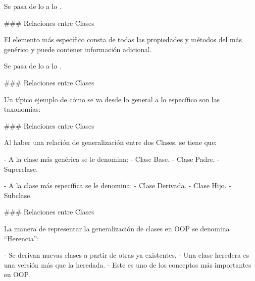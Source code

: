 \vspace{-1em}
\begin{center}\hspace{60mm}\begin{customRoundedBox}{}
\centering Se pasa de lo  a lo .
\end{customRoundedBox}\end{center}

### Relaciones entre Clases


\newline

El elemento más específico consta de todas las propiedades y métodos del más
genérico y puede contener información adicional.

\vspace{-1em}
\begin{center}\hspace{60mm}\begin{customRoundedBox}{}
\centering Se pasa de lo  a lo .
\end{customRoundedBox}\end{center}


### Relaciones entre Clases


Un típico ejemplo de cómo se va desde lo general a lo específico son las taxonomías:\newline

\taxonomyOrg


### Relaciones entre Clases


Al haber una relación de generalización entre dos Clases, se tiene que:

- A la clase más genérica se le denomina:
    - Clase Base.
    - Clase Padre.
    - Superclase.

- A la clase más específica se le denomina:
    - Clase Derivada.
    - Clase Hijo.
    - Subclase.

### Relaciones entre Clases


La manera de representar la generalización de clases en OOP se denomina ``Herencia'':

- Se derivan nuevas clases a partir de otras ya existentes.
- Una clase heredera es una versión más  que la heredada.
- Este es uno de los conceptos más importantes en OOP.


